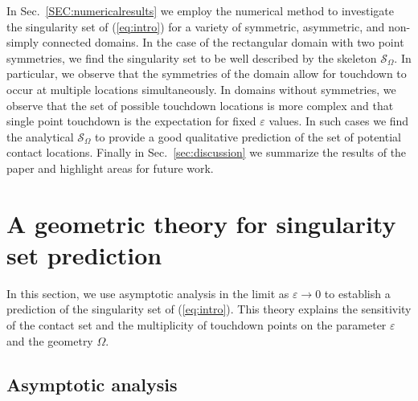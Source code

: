 \documentclass{siamart0516}
\renewcommand{\eqref}[1]{(\ref{#1})}
\newcommand{\eps}{\varepsilon}
\newcommand{\skel}{\mathcal{S}_{\Omega}}
\theoremstyle{plain}%
\theoremstyle{definition}
\theoremstyle{remark}
\begin{document}
In Sec.~\ref{SEC:numericalresults} we employ the numerical method to investigate the singularity set of \eqref{eq:intro} for a variety of symmetric, asymmetric, and non-simply connected domains. In the case of the rectangular domain with two point symmetries, we find the singularity set to be well described by the skeleton $\skel$. In particular, we observe that the symmetries of the domain allow for touchdown to occur at multiple locations simultaneously. In domains without symmetries, we observe that the set of possible touchdown locations is more complex and that single point touchdown is the expectation for fixed $\eps$ values. In such cases we find the analytical $\skel$ to provide a good qualitative prediction of the set of potential contact locations. Finally in Sec.~\ref{sec:discussion} we summarize the results of the paper and highlight areas for future work.

\section{A geometric theory for singularity set prediction}\label{sec:skeleton}

In this section, we use asymptotic analysis in the limit as $\eps\to0$ to establish a prediction of the singularity set of \eqref{eq:intro}. This theory explains the sensitivity of the contact set and the multiplicity of touchdown points on the parameter $\eps$ and the geometry $\Omega$.

\subsection{Asymptotic analysis}
\end{document}
